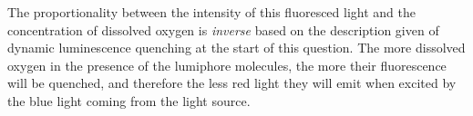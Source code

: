 \vskip 10pt

The proportionality between the intensity of this fluoresced light and the concentration of dissolved oxygen is {\it inverse} based on the description given of dynamic luminescence quenching at the start of this question.  The more dissolved oxygen in the presence of the lumiphore molecules, the more their fluorescence will be quenched, and therefore the less red light they will emit when excited by the blue light coming from the light source.











